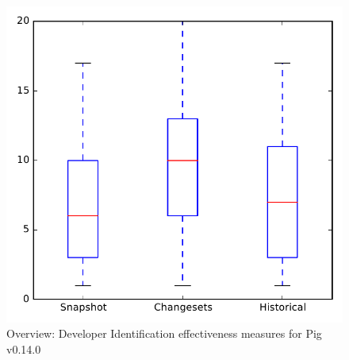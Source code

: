 
\begin{figure}
\centering
\includegraphics[height=0.4\textheight]{figures/dit/all_pig_no_outlier}
\caption{Overview: Developer Identification effectiveness measures for Pig v0.14.0}
\label{fig:dit:all:pig}
\end{figure}
